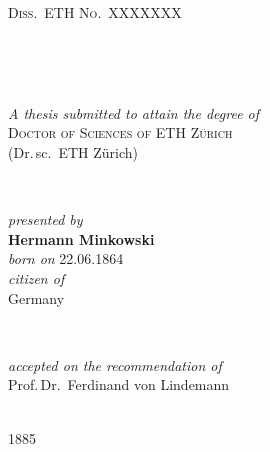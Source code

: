 \begin{titlepage}
  \begin{center}
    \begin{large}
      \textsc{Diss.\ ETH No.\ XXXXXXX}
    \end{large}\\[1.2cm]
    \begin{Huge}
      \makeatletter%
      \@title
      \makeatother%
    \end{Huge}\\[1.2cm]
    \begin{large}
      \emph{A thesis submitted to attain the degree of}\\
      \textsc{Doctor of Sciences of ETH Zürich}\\
      (Dr.\,sc.\ ETH Zürich)
    \end{large}\\[1.2cm]
    \begin{large}
        \emph{presented by}\\
        \textbf{Hermann Minkowski}\\
        \emph{born on} 22.06.1864\\[1.5em]
        \emph{citizen of}\\
        Germany
    \end{large}\\[1.2cm]
    \begin{large}
        \emph{accepted on the recommendation of}\\
        Prof.\,Dr.~Ferdinand von Lindemann
    \end{large}\\[1.5em]
    {\large 1885}
  \end{center}
\end{titlepage}

\newpage
\null
\thispagestyle{empty}
\newpage
